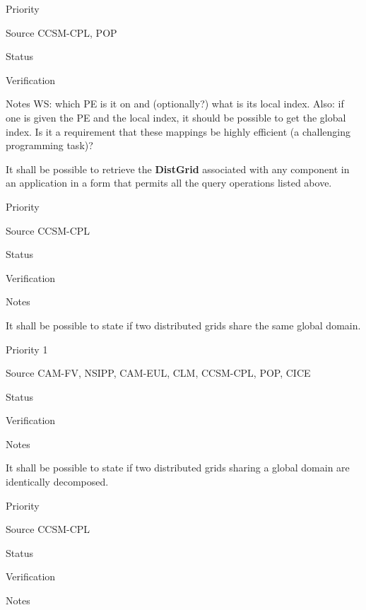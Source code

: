 \begin{reqlist}
\item[Priority] 
\item[Source] CCSM-CPL, POP
\item[Status]
\item[Verification]
\item[Notes] WS: which PE is it on and (optionally?) what 
is its local index.  Also: if one is given the PE and the local index, 
it should be possible to get the global index.  Is it a requirement that
these mappings be highly efficient (a challenging programming task)?
\end{reqlist}


It shall be possible to retrieve the \textbf{DistGrid} associated with
any component in an application in a form that permits all the query
operations listed above.

\begin{reqlist}
\item[Priority]
\item[Source] CCSM-CPL
\item[Status]
\item[Verification]
\item[Notes]
\end{reqlist}



It shall be possible to state if two distributed grids share the same
global domain.

\begin{reqlist}
\item[Priority] 1
\item[Source] CAM-FV, NSIPP, CAM-EUL, CLM, CCSM-CPL, POP, CICE
\item[Status]
\item[Verification]
\item[Notes]
\end{reqlist}



It shall be possible to state if two distributed grids sharing a
global domain are identically decomposed.

\begin{reqlist}
\item[Priority]
\item[Source] CCSM-CPL
\item[Status]
\item[Verification]
\item[Notes]
\end{reqlist}

